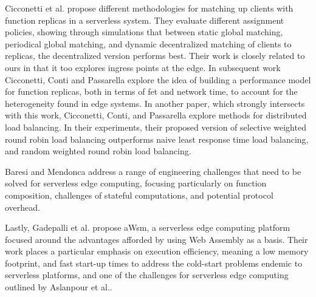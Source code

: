 Cicconetti et al. propose different methodologies for matching up clients with function replicas in a serverless system\cite{cicconettiDistributedComputingEnvironments2020}.
They evaluate different assignment policies, showing through simulations that between static global matching, periodical global matching, and dynamic decentralized matching of clients to replicas, the decentralized version performs best.
Their work is closely related to ours in that it too explores ingress points at the edge.
In subsequent work Cicconetti, Conti and Passarella\cite{cicconettiArchitecturePerformanceEvaluation2020} explore the idea of building a performance model for function replicas, both in terms of \gls{fet} and network time, to account for the heterogeneity found in edge systems.
In another paper, which strongly intersects with this work, Cicconetti, Conti, and Passarella explore methods for distributed load balancing\cite{cicconettiDecentralizedFrameworkServerless2020}.
In their experiments, their proposed version of selective weighted round robin load balancing outperforms naive least response time load balancing, and random weighted round robin load balancing.

Baresi and Mendonca\cite{baresiServerlessPlatformEdge2019} address a range of engineering challenges that need to be solved for serverless edge computing, focusing particularly on function composition, challenges of stateful computations, and potential protocol overhead.

Lastly, Gadepalli et al. \cite{gadepalliChallengesOpportunitiesEfficient2019} propose aWsm, a serverless edge computing platform focused around the advantages afforded by using Web Assembly as a basis.
Their work places a particular emphasis on execution efficiency, meaning a low memory footprint, and fast start-up times to address the cold-start problems endemic to serverless platforms, and one of the challenges for serverless edge computing outlined by Aslanpour et al.\cite{aslanpourServerlessEdgeComputing2021}.

